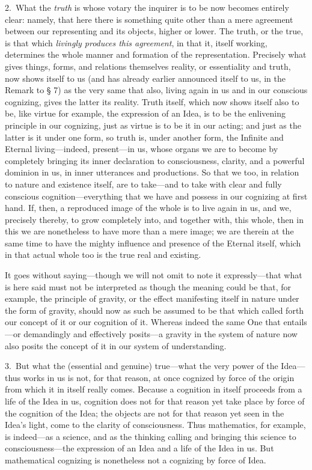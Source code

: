 \documentclass[12pt,a4paper]{book}
\begin{document}
2.~What the \emph{truth} is whose votary the inquirer is to be now becomes entirely
clear: namely, that here there is something quite other than a mere agreement between
our representing and its objects, higher or lower. The truth, or the true, is that
which \emph{livingly produces this agreement}, in that it, itself working, determines
the whole manner and formation of the representation. Precisely what gives things,
forms, and relations themselves reality, or essentiality and truth, now shows itself
to us (and has already earlier announced itself to us, in the Remark to § 7) as the
very same that also, living again in us and in our conscious cognizing, gives the
latter its reality. Truth itself, which now shows itself also to be, like virtue for
example, the expression of an Idea, is to be the enlivening principle in our
cognizing, just as virtue is to be it in our acting; and just as the latter is it
under one form, so truth is, under another form, the Infinite and Eternal
living---indeed, present---in us, whose organs we are to become by completely bringing
its inner declaration to consciousness, clarity, and a powerful dominion in us, in
inner utterances and productions. So that we too, in relation to nature and existence
itself, are to take---and to take with clear and fully conscious cognition---everything
that we have and possess in our cognizing at first hand. If, then, a reproduced image
of the whole is to live again in us, and we, precisely thereby, to grow completely
into, and together with, this whole, then in this we are nonetheless to have more than
a mere image; we are therein at the same time to have the mighty influence and
presence of the Eternal itself, which in that actual whole too is the true real and
existing.

It goes without saying---though we will not omit to note it expressly---that what is
here said must not be interpreted as though the meaning could be that, for example,
the principle of gravity, or the effect manifesting itself in nature under the form
of gravity, should now as such be assumed to be that which called forth our concept
of it or our cognition of it. Whereas indeed the same One that entails---or
demandingly and effectively posits---a gravity in the system of nature now also posits
the concept of it in our system of understanding.

3.~But what the (essential and genuine) true---what the very power of the Idea---thus
works in us is not, for that reason, at once cognized by force of the origin from
which it in itself really comes. Because a cognition in itself proceeds from a life of
the Idea in us, cognition does not for that reason yet take place by force of the
cognition of the Idea; the objects are not for that reason yet seen in the Idea's
light, come to the clarity of consciousness. Thus mathematics, for example, is
indeed---as a science, and as the thinking calling and bringing this science to
consciousness---the expression of an Idea and a life of the Idea in us. But
mathematical cognizing is nonetheless not a cognizing by force of Idea.
\end{document}

